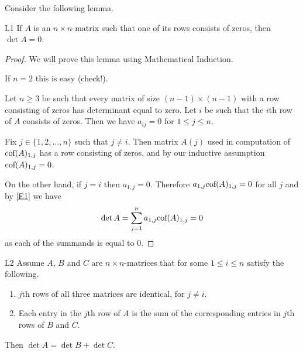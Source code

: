 Consider the following lemma.

\begin{lemma}{}{L1} 
If $A$ is an $n\times n$-matrix such that one of its rows consists of zeros, then 
$\det A=0$. 
\end{lemma} 

\begin{proof} 
We will prove this lemma using Mathematical Induction. 

If $n=2$ this is easy (check!). 

Let $n\geq 3$ be such that every matrix of size $(n-1)\times(n-1)$ with a row consisting of zeros
has determinant equal to zero.  
Let $i$ be such that the $i$th row of $A$ consists of zeros. 
Then we have $a_{ij}=0$ for $1\leq j\leq n$. 

Fix $j\in \{1,2, \dots ,n\}$ such that $j\neq i$. Then  matrix $A(j)$ used in computation of
 $\mbox{\rm cof}(A)_{1,j}$ has a row consisting of zeros, and by our inductive 
 assumption $\mbox{\rm cof}(A)_{1,j}=0$. 

On the other hand, if $j=i$ then $a_{1,j}=0$.  
Therefore $a_{1,j}\mbox{\rm cof}(A)_{1,j}=0$ for all $j$ and by \eqref{E1} we have 
\[
\det A=\sum_{j=1}^n a_{1,j} \mbox{\rm cof}(A)_{1,j}=0
\]
as each of the summands is equal to 0. 
\end{proof} 

\begin{lemma}{}{L2} 
Assume $A$, $B$ and $C$ are $n\times n$-matrices that for some 
 $1\leq i\leq n$ satisfy the following. 
\begin{enumerate}
\item $j$th rows of all three matrices are identical, for $j\neq i$. 

\item Each entry in the $j$th row of $A$ is the sum of the corresponding 
entries in $j$th rows of $B$ and $C$. 
\end{enumerate}

Then $\det A=\det B+\det C$. 
\end{lemma} 

